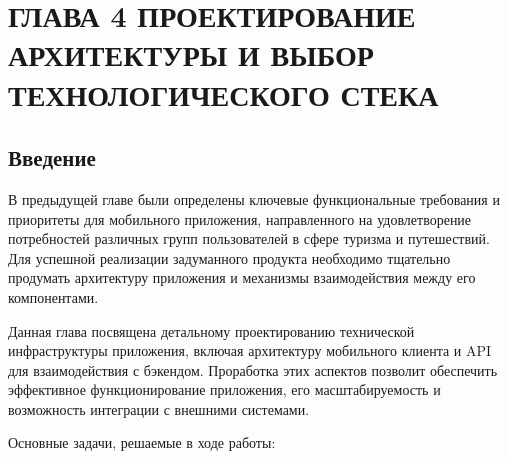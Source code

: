 \section{ГЛАВА 4 ПРОЕКТИРОВАНИЕ АРХИТЕКТУРЫ И ВЫБОР ТЕХНОЛОГИЧЕСКОГО СТЕКА}

\subsection*{Введение}

В предыдущей главе были определены ключевые функциональные требования и приоритеты для мобильного приложения, направленного на удовлетворение потребностей различных групп пользователей в сфере туризма и путешествий. Для успешной реализации задуманного продукта необходимо тщательно продумать архитектуру приложения и механизмы взаимодействия между его компонентами.

Данная глава посвящена детальному проектированию технической инфраструктуры приложения, включая архитектуру мобильного клиента и API для взаимодействия с бэкендом. Проработка этих аспектов позволит обеспечить эффективное функционирование приложения, его масштабируемость и возможность интеграции с внешними системами.

Основные задачи, решаемые в ходе работы:


